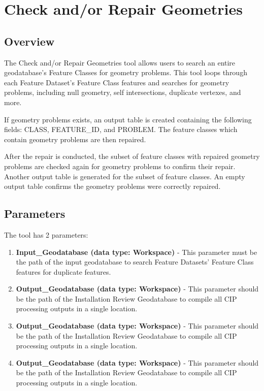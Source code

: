 \documentclass[openany]{book}
\providecommand{\tightlist}{%
  \setlength{\itemsep}{0pt}\setlength{\parskip}{0pt}}
\theoremstyle{definition}
\theoremstyle{definition}
\theoremstyle{definition}
\theoremstyle{remark}
\begin{document}
\hypertarget{chkGeom}{\chapter{Check and/or Repair
Geometries}\label{chkGeom}}

\section{Overview}\label{overview-5}

The Check and/or Repair Geometries tool allows users to search an entire
geodatabase's Feature Classes for geometry problems. This tool loops
through each Feature Dataset's Feature Class features and searches for
geometry problems, including null geometry, self intersections,
duplicate vertexes, and more.

If geometry problems exists, an output table is created containing the
following fields: CLASS, FEATURE\_ID, and PROBLEM. The feature classes
which contain geometry problems are then repaired.

After the repair is conducted, the subset of feature classes with
repaired geometry problems are checked again for geometry problems to
confirm their repair. Another output table is generated for the subset
of feature classes. An empty output table confirms the geometry problems
were correctly repaired.

\section{Parameters}\label{parameters-5}

The tool has 2 parameters:

\begin{enumerate}
\def\labelenumi{\arabic{enumi}.}
\tightlist
\item
  \textbf{Input\_Geodatabase (data type: Workspace)} - This parameter
  must be the path of the input geodatabase to search Feature Datasets'
  Feature Class features for duplicate features.
\item
  \textbf{Output\_Geodatabase (data type: Workspace)} - This parameter
  should be the path of the Installation Review Geodatabase to compile
  all CIP processing outputs in a single location.
\item
  \textbf{Output\_Geodatabase (data type: Workspace)} - This parameter
  should be the path of the Installation Review Geodatabase to compile
  all CIP processing outputs in a single location.
\item
  \textbf{Output\_Geodatabase (data type: Workspace)} - This parameter
  should be the path of the Installation Review Geodatabase to compile
  all CIP processing outputs in a single location.
\end{enumerate}
\end{document}
